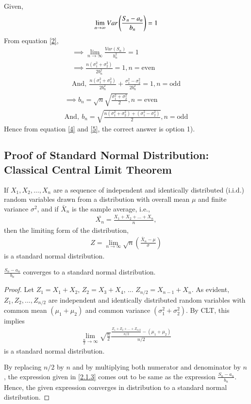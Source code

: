 \documentclass[journal,12pt,twocolumn]{IEEEtran}
\begin{document}
Given,
\begin{align}
    \lim_{n\to\infty}Var\left(\frac{S_n-a_n}{b_n}\right)=1
\end{align}
From equation \eqref{2},
\begin{align}
    \implies \lim_{n\to\infty}\frac{Var(S_n)}{b_n^2}=1\\
    \implies \frac{n(\sigma_1^2+\sigma_2^2)}{2b_n^2}=1,n=\mathrm{even}\\
    \mathrm{And,\:}\frac{n(\sigma_1^2+\sigma_2^2)}{2b_n^2}+\frac{\sigma_1^2-\sigma_2^2}{2b_n^2}=1,n=\mathrm{odd}
    \end{align}
    \begin{align}
    \implies b_n=\sqrt{n}\sqrt{\frac{\sigma_1^2+\sigma_2^2}{2}},n=\mathrm{even}\label{4}\\
    \mathrm{And,\:}b_n=\sqrt{\frac{n(\sigma_1^2+\sigma_2^2)+(\sigma_1^2-\sigma_2^2)}{2}},n=\mathrm{odd}
\end{align}
Hence from equation \eqref{4} and \eqref{5}, the correct answer is option 1).
\subsection{Proof of Standard Normal Distribution: Classical Central Limit Theorem}
\begin{theorem}
If ${\textstyle X_{1},X_{2},\dots ,X_{n}}$ are a sequence of independent and identically distributed (i.i.d.) random variables drawn from a distribution with overall mean ${\textstyle \mu }$ and finite variance ${\textstyle \sigma ^{2}}$, and if ${\textstyle {\bar {X}}_{n}}$ is the sample average, i.e.,
\begin{align}
   \bar{X_n}=\frac{X_1+X_2+...+X_n}{n}, 
\end{align}
then the limiting form of the distribution,
\begin{align}
    {\textstyle Z=\lim _{n\to \infty }{\sqrt {n}}{\left({\frac {{\bar {X}}_{n}-\mu }{\sigma }}\right)}}\label{2.1.2}
\end{align}
is a standard normal distribution.
\end{theorem}
\begin{corollary}
$\frac{S_n-a_n}{b_n}$ converges to a standard normal distribution.
\end{corollary}
\begin{proof}
Let $Z_1=X_1+X_2$, $Z_2=X_3+X_4$, ... $Z_{n/2}=X_{n-1}+X_n$. As evident, $Z_1,Z_2,...,Z_{n/2}$ are independent and identically distributed random variables with common mean $(\mu_1+\mu_2)$ and common variance $(\sigma_1^2+\sigma_2^2)$.
By CLT, this implies
\begin{align}
    \lim_{\frac{n}{2}\to\infty}\sqrt{\frac{n}{2}}\frac{\frac{Z_1+Z_2+...+Z_{n/2}}{n/2}-(\mu_1+\mu_2)}{n/2}\label{2.1.3}
\end{align}
is a standard normal distribution.\par
By replacing $n/2$ by $n$ and by multiplying both numerator and denominator by $n$, the expression given in \eqref{2.1.3} comes out to be same as the expression $\frac{S_n-a_n}{b_n}$. Hence, the given expression converges in distribution to a standard normal distribution.
\end{proof}
\end{document}
